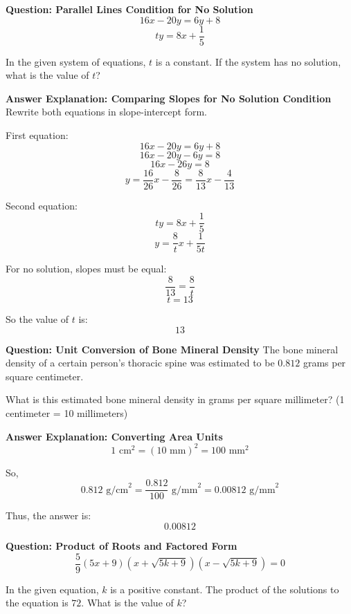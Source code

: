 \documentclass{beamer}
\begin{document}
\begin{frame}{\textbf{Question: Parallel Lines Condition for No Solution}}
\small
\[
16x - 20y = 6y + 8
\]
\[
ty = 8x + \frac{1}{5}
\]

In the given system of equations, $t$ is a constant. If the system has no solution, what is the value of $t$?
\end{frame}

\begin{frame}{\textbf{Answer Explanation: Comparing Slopes for No Solution Condition}}
\small
Rewrite both equations in slope-intercept form.

First equation:
\[
16x - 20y = 6y + 8
\]
\[
16x - 20y - 6y = 8
\]
\[
16x - 26y = 8
\]
\[
y = \frac{16}{26}x - \frac{8}{26} = \frac{8}{13}x - \frac{4}{13}
\]

Second equation:
\[
ty = 8x + \frac{1}{5}
\]
\[
y = \frac{8}{t}x + \frac{1}{5t}
\]

For no solution, slopes must be equal:
\[
\frac{8}{13} = \frac{8}{t}
\]
\[
t = 13
\]

So the value of $t$ is:
\[
\boxed{13}
\]
\end{frame}

\begin{frame}{\textbf{Question: Unit Conversion of Bone Mineral Density}}
\small
The bone mineral density of a certain person's thoracic spine was estimated to be $0.812$ grams per square centimeter.

What is this estimated bone mineral density in grams per square millimeter? (1 centimeter = 10 millimeters)
\end{frame}

\begin{frame}{\textbf{Answer Explanation: Converting Area Units}}
\small
\[
1 \text{ cm}^2 = (10 \text{ mm})^2 = 100 \text{ mm}^2
\]

So,
\[
0.812 \text{ g/cm}^2 = \frac{0.812}{100} \text{ g/mm}^2 = 0.00812 \text{ g/mm}^2
\]

Thus, the answer is:
\[
\boxed{0.00812}
\]
\end{frame}


\begin{frame}{\textbf{Question: Product of Roots and Factored Form}}
\small
\[
\frac{5}{9}(5x + 9)(x + \sqrt{5k+9} )(x - \sqrt{5k+9} ) = 0
\]

In the given equation, $k$ is a positive constant. The product of the solutions to the equation is $72$. What is the value of $k$?
\end{frame}
\end{document}
